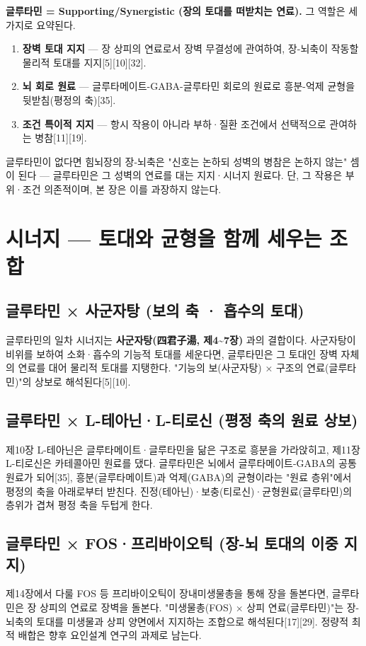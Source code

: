 \documentclass[11pt,oneside]{book}
\begin{document}
\textbf{글루타민 = Supporting/Synergistic (장의 토대를 떠받치는 연료).} 그 역할은 세 가지로 요약된다.

\begin{enumerate}[leftmargin=6mm,itemsep=1pt,topsep=2pt]
  \item \textbf{장벽 토대 지지} — 장 상피의 연료로서 장벽 무결성에 관여하여, 장-뇌축이 작동할 물리적 토대를 지지[5][10][32].
  \item \textbf{뇌 회로 원료} — 글루타메이트-GABA-글루타민 회로의 원료로 흥분-억제 균형을 뒷받침(평정의 축)[35].
  \item \textbf{조건 특이적 지지} — 항시 작용이 아니라 부하·질환 조건에서 선택적으로 관여하는 병참[11][19].
\end{enumerate}
글루타민이 없다면 힘뇌장의 장-뇌축은 "신호는 논하되 성벽의 병참은 논하지 않는" 셈이 된다 — 글루타민은 그 성벽의 연료를 대는 지지·시너지 원료다. 단, 그 작용은 부위·조건 의존적이며, 본 장은 이를 과장하지 않는다.

\section{시너지 — 토대와 균형을 함께 세우는 조합}
\subsection{글루타민 × 사군자탕 (보의 축 · 흡수의 토대)}
글루타민의 일차 시너지는 \textbf{사군자탕(四君子湯, 제4\textasciitilde{}7장)} 과의 결합이다. 사군자탕이 비위를 보하여 소화·흡수의 기능적 토대를 세운다면, 글루타민은 그 토대인 장벽 자체의 연료를 대어 물리적 토대를 지탱한다. "기능의 보(사군자탕) × 구조의 연료(글루타민)"의 상보로 해석된다[5][10].

\subsection{글루타민 × L-테아닌·L-티로신 (평정 축의 원료 상보)}
제10장 L-테아닌은 글루타메이트·글루타민을 닮은 구조로 흥분을 가라앉히고, 제11장 L-티로신은 카테콜아민 원료를 댔다. 글루타민은 뇌에서 글루타메이트-GABA의 공통 원료가 되어[35], 흥분(글루타메이트)과 억제(GABA)의 균형이라는 "원료 층위"에서 평정의 축을 아래로부터 받친다. 진정(테아닌)·보충(티로신)·균형원료(글루타민)의 층위가 겹쳐 평정 축을 두텁게 한다.

\subsection{글루타민 × FOS·프리바이오틱 (장-뇌 토대의 이중 지지)}
제14장에서 다룰 FOS 등 프리바이오틱이 장내미생물총을 통해 장을 돌본다면, 글루타민은 장 상피의 연료로 장벽을 돌본다. "미생물총(FOS) × 상피 연료(글루타민)"는 장-뇌축의 토대를 미생물과 상피 양면에서 지지하는 조합으로 해석된다[17][29]. 정량적 최적 배합은 향후 요인설계 연구의 과제로 남는다.
\end{document}
